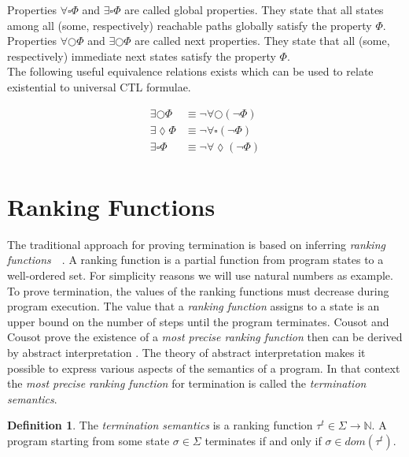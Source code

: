 \documentclass[11pt,a4paper,titlepage]{article}
\theoremstyle{definition}
\newtheorem{definition}{Definition}[section]
\begin{document}
Properties $\forall\square\Phi$ and $\exists\square\Phi$ are called \textsf{global} properties. They state that all states among 
all (some, respectively) reachable paths globally satisfy the property $\Phi$.\\

Properties $\forall\bigcirc\Phi$ and $\exists\bigcirc\Phi$ are called \textsf{next} properties. They state that all (some, respectively) immediate next
states satisfy the property $\Phi$.\\

The following useful equivalence relations 
exists which can be used to relate existential to universal CTL formulae.

\begin{align*}
    \exists\bigcirc\Phi &\equiv \neg \forall\bigcirc(\neg \Phi)\\ 
    \exists\lozenge\Phi &\equiv \neg \forall\square(\neg \Phi) \\
    \exists\square\Phi  &\equiv \neg \forall\lozenge(\neg \Phi) \\
\end{align*}

\section{Ranking Functions}\label{sec:ranking_functions}

The traditional approach for proving termination is based on inferring \textit{ranking functions}~\cite{Touring49}~\cite{Floyd67}.
A ranking function is a partial function from program states to a well-ordered set. For simplicity reasons we will use natural numbers as example.
To prove termination, the values of the ranking functions must decrease during program execution. 
The value that a \textit{ranking function} assigns to a state is an upper bound on the number of steps until the program terminates.
Cousot and Cousot prove the existence of a \textit{most precise ranking function} then can be derived 
by abstract interpretation \cite{CousotCousot-POPL12}. The theory of abstract interpretation makes it possible to express 
various aspects of the semantics of a program. In that context the \textit{most precise ranking function} for termination is called
the \textit{termination semantics}.

\begin{definition}
    The \textit{termination semantics} is a ranking function 
    $\tau^{t} \in \Sigma \rightarrow \mathbb{N}$.
    A program starting from some state $\sigma \in \Sigma$ terminates if and only if $\sigma \in dom(\tau^{t})$.
\end{definition}
\end{document}
